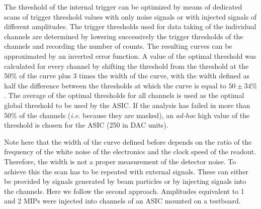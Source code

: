 \documentclass[final,3p,times,twocolumn]{elsarticle}
\begin{document}
The threshold of the internal trigger can be optimized by means of dedicated scans of trigger threshold values
with only noise signals or with injected signals of different amplitudes.
The trigger thresholds used for data taking of the individual channels
are determined by lowering successively the trigger thresholds of the
channels and recording the number of counts. The resulting curves can be approximated by an inverted error function.
A value of the optimal threshold was calculated for every channel by shifting the threshold
from the threshold at the 50\% of the curve plus 3 times the width of the curve, 
with the width defined as half the difference between the thresholds
at which the curve is equal to $50\pm34\%$. The average of the optimal thresholds for all channels
is used as the optimal global threshold to be used by the ASIC.
If the analysis has failed in more than 50\% of the channels ({\it i.e.} because they are masked),
an {\it ad-hoc} high value of the threshold is chosen for the ASIC (250 in DAC units).

Note here that the width of the curve defined before depends on the ratio
of the frequency of the white noise of the electronics and the clock speed of the readout.
Therefore, the width is not a proper measurement of the detector noise.
To achieve this the scan has to be repeated with external signals.
These can either be provided by signals generated by beam particles or by injecting signals into the channels.
Here we follow the second approach. Amplitudes equivalent to 1 and 2 MIPs were injected into channels of an ASIC mounted on a testboard.
\end{document}
